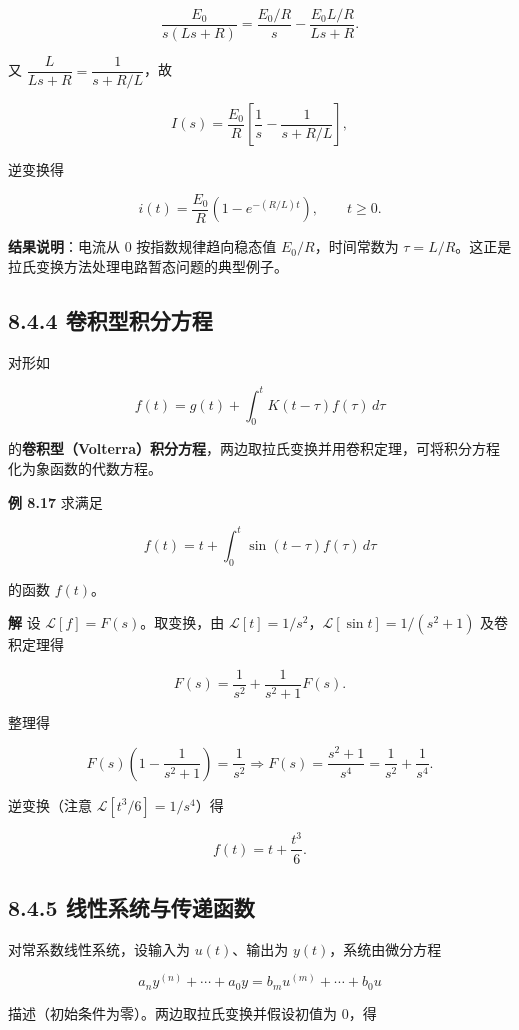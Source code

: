 \[
\frac{E_0}{s(Ls+R)}=\frac{E_0/R}{s}-\frac{E_0 L/R}{Ls+R}.
\]

又 \(\dfrac{L}{Ls+R}=\dfrac{1}{s+R/L}\)，故

\[
I(s)=\frac{E_0}{R}\left[\frac{1}{s}-\frac{1}{s+R/L}\right],
\]

逆变换得

\[
i(t)=\frac{E_0}{R}\left(1-e^{-(R/L)t}\right),\qquad t\ge 0 .
\]

\textbf{结果说明}：电流从 \(0\) 按指数规律趋向稳态值
\(E_0/R\)，时间常数为
\(\tau=L/R\)。这正是拉氏变换方法处理电路暂态问题的典型例子。

\subsection{8.4.4
卷积型积分方程}\label{ux5377ux79efux578bux79efux5206ux65b9ux7a0b}

对形如

\[
f(t)=g(t)+\int_0^{t}K(t-\tau)f(\tau)\,d\tau
\]

的\textbf{卷积型（Volterra）积分方程}，两边取拉氏变换并用卷积定理，可将积分方程化为象函数的代数方程。

\textbf{例 8.17} 求满足

\[
f(t)=t+\int_0^{t}\sin(t-\tau)f(\tau)\,d\tau
\]

的函数 \(f(t)\)。

\textbf{解} 设 \(\mathcal{L}[f]=F(s)\)。取变换，由
\(\mathcal{L}[t]=1/s^2\)，\(\mathcal{L}[\sin t]=1/(s^2+1)\) 及卷积定理得

\[
F(s)=\frac{1}{s^2}+\frac{1}{s^2+1}F(s).
\]

整理得

\[
F(s)\left(1-\frac{1}{s^2+1}\right)=\frac{1}{s^2}
\Rightarrow F(s)=\frac{s^2+1}{s^4}=\frac{1}{s^2}+\frac{1}{s^4}.
\]

逆变换（注意 \(\mathcal{L}[t^3/6]=1/s^4\)）得

\[
f(t)=t+\frac{t^3}{6}.
\]

\subsection{8.4.5
线性系统与传递函数}\label{ux7ebfux6027ux7cfbux7edfux4e0eux4f20ux9012ux51fdux6570}

对常系数线性系统，设输入为 \(u(t)\)、输出为 \(y(t)\)，系统由微分方程

\[
a_n y^{(n)}+\cdots+a_0 y=b_m u^{(m)}+\cdots+b_0 u
\]

描述（初始条件为零）。两边取拉氏变换并假设初值为 \(0\)，得

